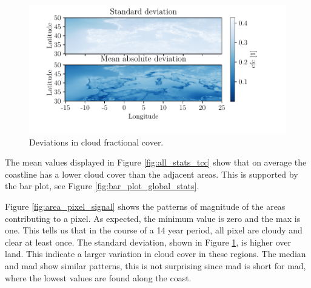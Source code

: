 \begin{figure}
    \centering
    \includegraphics{python_figs/DEVIATION_all_stat_variable_tcc.pdf}
    \caption{Deviations in  cloud fractional cover.}
    \label{fig:deviation_tcc}
\end{figure}

The mean values displayed in Figure \ref{fig:all_stats_tcc} show that on average the coastline has a lower cloud cover than the adjacent areas. This is supported by the bar plot, see Figure \ref{fig:bar_plot_global_stats}. 

Figure \ref{fig:area_pixel_signal} shows the patterns of magnitude of the areas contributing to a pixel. As expected, the minimum value is zero and the max is one. This tells us that in the course of a 14 year period, all pixel are cloudy and clear at least once.
The standard deviation, shown in Figure \ref{fig:deviation_tcc}, is higher over land. This indicate a larger variation in cloud cover in these regions. The median and \acrshort{mad} %
show similar patterns, this is not surprising since \acrshort{mad} is short for \acrlong{mad}, where the lowest values are found along the coast.

